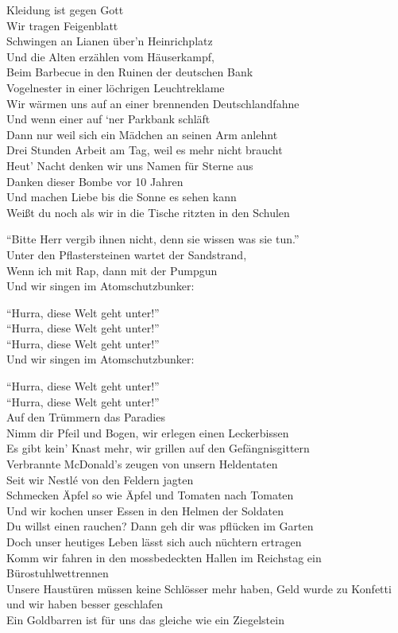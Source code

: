 \documentclass[]{book}
\begin{document}
Kleidung ist gegen Gott\\
Wir tragen Feigenblatt\\
Schwingen an Lianen über'n Heinrichplatz\\
Und die Alten erzählen vom Häuserkampf,\\
Beim Barbecue in den Ruinen der deutschen Bank\\
Vogelnester in einer löchrigen Leuchtreklame\\
Wir wärmen uns auf an einer brennenden Deutschlandfahne\\
Und wenn einer auf `ner Parkbank schläft\\
Dann nur weil sich ein Mädchen an seinen Arm anlehnt\\
Drei Stunden Arbeit am Tag, weil es mehr nicht braucht\\
Heut' Nacht denken wir uns Namen für Sterne aus\\
Danken dieser Bombe vor 10 Jahren\\
Und machen Liebe bis die Sonne es sehen kann\\
Weißt du noch als wir in die Tische ritzten in den Schulen

``Bitte Herr vergib ihnen nicht, denn sie wissen was sie tun.''\\
Unter den Pflastersteinen wartet der Sandstrand,\\
Wenn ich mit Rap, dann mit der Pumpgun\\
Und wir singen im Atomschutzbunker:

``Hurra, diese Welt geht unter!''\\
``Hurra, diese Welt geht unter!''\\
``Hurra, diese Welt geht unter!''\\
Und wir singen im Atomschutzbunker:

``Hurra, diese Welt geht unter!''\\
``Hurra, diese Welt geht unter!''\\
Auf den Trümmern das Paradies\\
Nimm dir Pfeil und Bogen, wir erlegen einen Leckerbissen\\
Es gibt kein' Knast mehr, wir grillen auf den Gefängnisgittern\\
Verbrannte McDonald's zeugen von unsern Heldentaten\\
Seit wir Nestlé von den Feldern jagten\\
Schmecken Äpfel so wie Äpfel und Tomaten nach Tomaten\\
Und wir kochen unser Essen in den Helmen der Soldaten\\
Du willst einen rauchen? Dann geh dir was pflücken im Garten\\
Doch unser heutiges Leben lässt sich auch nüchtern ertragen\\
Komm wir fahren in den mossbedeckten Hallen im Reichstag ein Bürostuhlwettrennen\\
Unsere Haustüren müssen keine Schlösser mehr haben, Geld wurde zu Konfetti und wir haben besser geschlafen\\
Ein Goldbarren ist für uns das gleiche wie ein Ziegelstein
\end{document}
